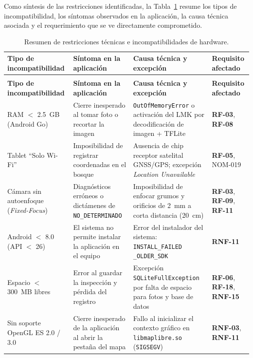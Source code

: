 Como síntesis de las restricciones identificadas, la Tabla~\ref{tab:resumen_incompatibilidad} resume los tipos de incompatibilidad, los síntomas observados en la aplicación, la causa técnica asociada y el requerimiento que se ve directamente comprometido.

\begin{longtable}{|>{\raggedright\arraybackslash}m{2.8cm}|>{\raggedright\arraybackslash}m{3.3cm}|>{\raggedright\arraybackslash}m{4.7cm}|>{\centering\arraybackslash}m{2.8cm}|}
\caption{Resumen de restricciones técnicas e incompatibilidades de hardware.}
\label{tab:resumen_incompatibilidad} \\
\hline
\textbf{Tipo de incompatibilidad} & \textbf{Síntoma en la aplicación} & \textbf{Causa técnica y excepción} & \textbf{Requisito afectado} \\
\hline
\endfirsthead
\multicolumn{4}{c}{{\bfseries Tabla \thetable\ -- continuación}} \\
\hline
\textbf{Tipo de incompatibilidad} & \textbf{Síntoma en la aplicación} & \textbf{Causa técnica y excepción} & \textbf{Requisito afectado} \\
\hline
\endhead

RAM $<$ 2.5~GB (Android Go) & Cierre inesperado al tomar foto o recortar la imagen & \texttt{OutOfMemoryError} o activación del LMK por decodificación de imagen + TFLite & \textbf{RF-03}, \textbf{RF-08} \\
\hline
Tablet ``Solo Wi-Fi'' & Imposibilidad de registrar coordenadas en el bosque & Ausencia de chip receptor satelital GNSS/GPS; excepción \textit{Location Unavailable} & \textbf{RF-05}, NOM-019 \\
\hline
Cámara sin autoenfoque (\textit{Fixed-Focus}) & Diagnósticos erróneos o dictámenes de \texttt{NO\_DETERMINADO} & Imposibilidad de enfocar grumos y orificios de 2~mm a corta distancia (20~cm) & \textbf{RF-03}, \textbf{RF-09}, \textbf{RF-11} \\
\hline
Android $<$ 8.0 (API $<$ 26) & El sistema no permite instalar la aplicación en el equipo & Error del instalador del sistema: \texttt{INSTALL\_FAILED} \texttt{\_OLDER\_SDK} & \textbf{RNF-11} \\
\hline
Espacio $<$ 300~MB libres & Error al guardar la inspección y pérdida del registro & Excepción \texttt{SQLiteFullException} por falta de espacio para fotos y base de datos & \textbf{RF-06}, \textbf{RF-18}, \textbf{RNF-15} \\
\hline
Sin soporte OpenGL ES 2.0 / 3.0 & Cierre inesperado de la aplicación al abrir la pestaña del mapa & Fallo al inicializar el contexto gráfico en \texttt{libmaplibre.so} (\texttt{SIGSEGV}) & \textbf{RNF-03}, \textbf{RNF-11} \\
\hline
\end{longtable}
